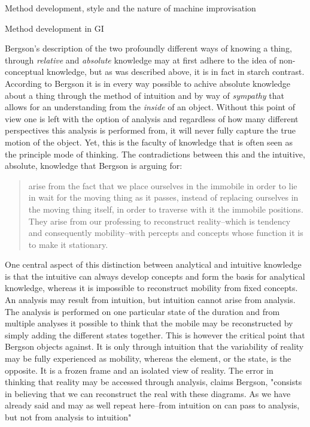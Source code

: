 \documentclass[presentation]{beamer}
\begin{document}
\begin{frame}[label={sec:org08c5441}]{Method development, style and the nature of machine improvisation}
\begin{block}{Method development in GI}
{{Bergson's description of the two profoundly different ways of knowing a thing, through \emph{relative} and \emph{absolute} knowledge may at first adhere to the idea of non-conceptual knowledge, but as was described above, it is in fact in starch contrast. According to Bergson it is in every way possible to achive absolute knowledge about a thing through the method of intuition and by way of \emph{sympathy} that allows for an understanding from the \emph{inside} of an object. Without this point of view one is left with the option of analysis and regardless of how many different perspectives this analysis is performed from, it will never fully capture the true motion of the object. Yet, this is the faculty of knowledge that is often seen as the principle mode of thinking. The contradictions between this and the intuitive, absolute, knowledge that Bergson is arguing for:

\begin{quote}
arise from the fact that we place ourselves in the immobile in order to lie in wait for the moving thing as it passes, instead of replacing ourselves in the moving thing itself, in order to traverse with it the immobile positions. They arise from our professing to reconstruct reality--which is tendency and consequently mobility--with percepts and concepts whose function it is to make it stationary. \citep[p. 67]{Bergson1912}
\end{quote}

One central aspect of this distinction between analytical and intuitive knowledge is that the intuitive can always develop concepts and form the basis for analytical knowledge, whereas it is impossible to reconstruct mobility from fixed concepts. An analysis may result from intuition, but intuition cannot arise from analysis. The analysis is performed on one particular state of the duration and from multiple analyses it possible to think that the mobile may be reconstructed by simply adding the different states together. This is however the critical point that Bergson objects against. It is only through intuition that the variability of reality may be fully experienced as mobility, whereas the element, or the state, is the opposite. It is a frozen frame and an isolated view of reality. The error in thinking that reality may be accessed through analysis, claims Bergson, "consists in believing that we can reconstruct the real with these diagrams. As we have already said and may as well repeat here--from intuition on can pass to analysis, but not from analysis to intuition" \citep[p. 48]{Bergson1912}

}}
\end{block}
\end{frame}
\end{document}
